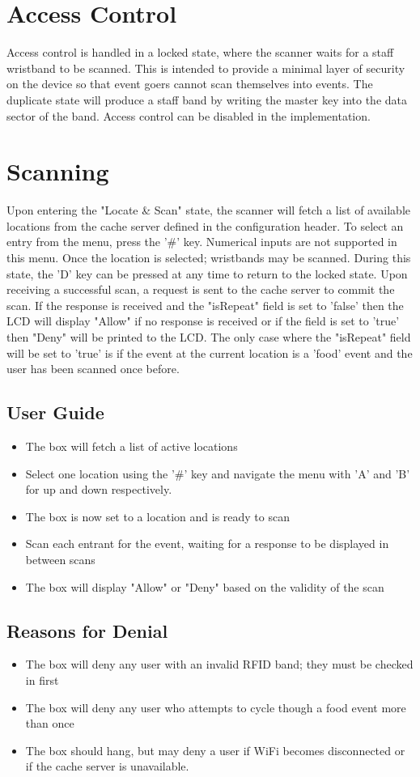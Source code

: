 \documentclass{article}
\begin{document}
\section{Access Control}
Access control is handled in a locked state, where the scanner waits for a staff wristband to be scanned.  This is intended to provide a minimal layer of security on the device so that event goers cannot scan themselves into events.  The duplicate state will produce a staff band by writing the master key into the data sector of the band.  Access control can be disabled in the implementation.

\section{Scanning}
Upon entering the "Locate \& Scan" state, the scanner will fetch a list of available locations from the cache server defined in the configuration header.  To select an entry from the menu, press the '\#' key. Numerical inputs are not supported in this menu.  Once the location is selected; wristbands may be scanned.  During this state, the 'D' key can be pressed at any time to return to the locked state.  Upon receiving a successful scan, a request is sent to the cache server to commit the scan.  If the response is received and the "isRepeat" field is set to 'false' then the LCD will display "Allow" if no response is received or if the field is set to 'true' then "Deny" will be printed to the LCD.  The only case where the "isRepeat" field will be set to 'true' is if the event at the current location is a 'food' event and the user has been scanned once before.  
\subsection{User Guide}
\begin{itemize}
	\item The box will fetch a list of active locations
	\item Select one location using the '\#' key and navigate the menu with 'A' and 'B' for up and down respectively.
	\item The box is now set to a location and is ready to scan
	\item Scan each entrant for the event, waiting for a response to be displayed in between scans
	\item The box will display "Allow" or "Deny" based on the validity of the scan
\end{itemize}
\subsection{Reasons for Denial}
\begin{itemize}
	\item The box will deny any user with an invalid RFID band; they must be checked in first
	\item The box will deny any user who attempts to cycle though a food event more than once
	\item The box should hang, but may deny a user if WiFi becomes disconnected or if the cache server is unavailable.
\end{itemize}
\end{document}
